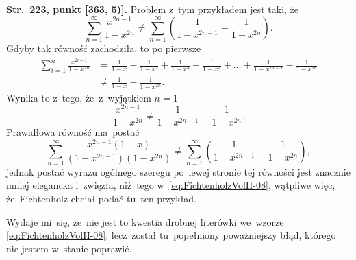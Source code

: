 \documentclass[a4paper,11pt]{article}
\begin{document}
\start \textbf{Str.~223, punkt [363, 5)].} Problem z~tym przykładem
jest taki, że
\begin{equation}
  \label{eq:FichtenholzVolII-08}
  \sum_{ n = 1 }^{ \infty } \frac{ x^{ 2n - 1 } }{ 1 - x^{ 2n } }
  \neq \sum_{ n = 1 }^{ \infty } \left( \frac{ 1 }{ 1 - x^{ 2n - 1 } }
    - \frac{ 1 }{ 1 - x^{ 2n } } \right).
\end{equation}
Gdyby tak równość zachodziła, to po pierwsze
\begin{equation}
  \label{eq:FichtenholzVolII-09}
  \begin{split}
    \sum_{ i = 1 }^{ n } \frac{ x^{ 2i - 1 } }{ 1 - x^{ 2n } } &=
    \frac{ 1 }{ 1 - x } - \frac{ 1 }{ 1 - x^{ 2 } } + \frac{ 1 }{ 1 -
      x^{ 3 } } - \frac{ 1 }{ 1 - x^{ 4 } }
    + \ldots + \frac{ 1 }{ 1 - x^{ 2n - 1 } } - \frac{ 1 }{ 1 - x^{ 2n } } \\
    &\neq \frac{ 1 }{ 1 - x } - \frac{ 1 }{ 1 - x^{ 2n } }.
  \end{split}
\end{equation}
Wynika to z~tego, że~z~wyjątkiem $n = 1$
\begin{equation}
  \label{eq:FichtenholzVolII-10}
  \frac{ x^{ 2n - 1 } }{ 1 - x^{ 2n } }
  \neq \frac{ 1 }{ 1 - x^{ 2n - 1 } } - \frac{ 1 }{ 1 - x^{ 2n } }.
\end{equation}
Prawidłowa równość ma~postać
\begin{equation}
  \label{eq:FichtenholzVolII-11}
  \sum_{ n = 1 }^{ \infty } \frac{ x^{ 2n - 1 } ( 1 - x ) }{ ( 1 - x^{ 2n - 1 } )
    ( 1 - x^{ 2n } ) }
  \neq \sum_{ n = 1 }^{ \infty } \left( \frac{ 1 }{ 1 - x^{ 2n - 1 } }
    - \frac{ 1 }{ 1 - x^{ 2n } } \right),
\end{equation}
jednak postać wyrazu ogólnego szeregu po~lewej stronie tej równości
jest znacznie mniej elegancka i~zwięzła, niż~tego
w~\eqref{eq:FichtenholzVolII-08}, wątpliwe więc, że~Fichtenholz chciał
podać tu~ten przykład.

Wydaje mi~się, że~nie jest to kwestia drobnej literówki we~wzorze
\eqref{eq:FichtenholzVolII-08}, lecz~został tu~popełniony poważniejszy
błąd, którego nie jestem w~stanie poprawić.

\vspace{\spaceFour}
\end{document}
